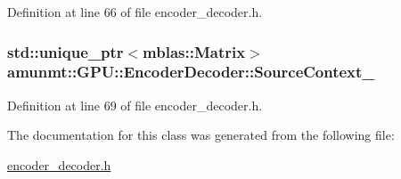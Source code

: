 Definition at line 66 of file encoder\+\_\+decoder.\+h.

\subsubsection[{\texorpdfstring{Source\+Context\+\_\+}{SourceContext_}}]{\setlength{\rightskip}{0pt plus 5cm}std\+::unique\+\_\+ptr$<${\bf mblas\+::\+Matrix}$>$ amunmt\+::\+G\+P\+U\+::\+Encoder\+Decoder\+::\+Source\+Context\+\_\+\hspace{0.3cm}{\ttfamily [private]}}\hypertarget{classamunmt_1_1GPU_1_1EncoderDecoder_a14a3d24c5ddf7916a3c1e853eae929ff}{}\label{classamunmt_1_1GPU_1_1EncoderDecoder_a14a3d24c5ddf7916a3c1e853eae929ff}


Definition at line 69 of file encoder\+\_\+decoder.\+h.



The documentation for this class was generated from the following file\+:\begin{DoxyCompactItemize}
\item 
\hyperlink{encoder__decoder_8h}{encoder\+\_\+decoder.\+h}\end{DoxyCompactItemize}
